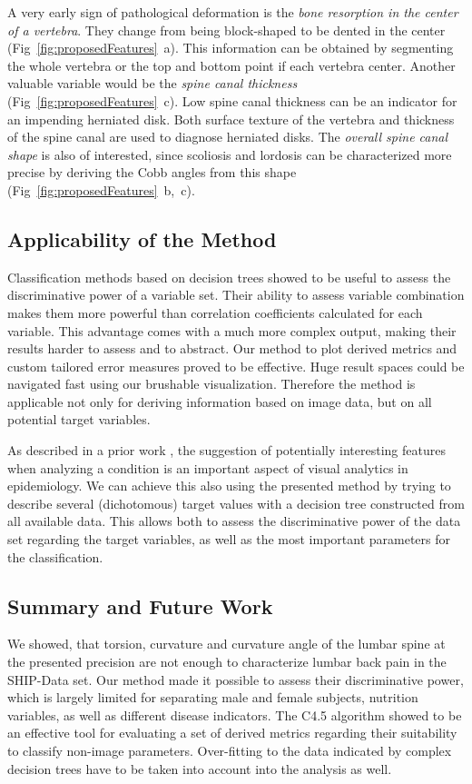 \documentclass[a4paper,twoside]{style/article}
\begin{document}
A very early sign of pathological deformation is the \emph{bone resorption in the center of a vertebra}.
They change from being block-shaped to be dented in the center (Fig~\ref{fig:proposedFeatures}~a).
This information can be obtained by segmenting the whole vertebra or the top and bottom point if each vertebra center.
Another valuable variable would be the \emph{spine canal thickness} (Fig~\ref{fig:proposedFeatures}~c).
Low spine canal thickness can be an indicator for an impending herniated disk.
Both surface texture of the vertebra and thickness of the spine canal are used to diagnose herniated disks.
The \emph{overall spine canal shape} is also of interested, since scoliosis and lordosis can be characterized more precise by deriving the Cobb angles from this shape (Fig~\ref{fig:proposedFeatures}~b,~c).
\subsection{Applicability of the Method}
Classification methods based on decision trees showed to be useful to assess the discriminative power of a variable set.
Their ability to assess variable combination makes them more powerful than correlation coefficients calculated for each variable.
This advantage comes with a much more complex output, making their results harder to assess and to abstract.
Our method to plot derived metrics and custom tailored error measures proved to be effective.
Huge result spaces could be navigated fast using our brushable visualization.
Therefore the method is applicable not only for deriving information based on image data, but on all potential target variables.

As described in a prior work \cite{Klemm2014VIS}, the suggestion of potentially interesting features when analyzing a condition is an important aspect of visual analytics in epidemiology.
We can achieve this also using the presented method by trying to describe several (dichotomous) target values with a decision tree constructed from all available data.
This allows both to assess the discriminative power of the data set regarding the target variables, as well as the most important parameters for the classification.

\subsection{Summary and Future Work}
\noindent We showed, that torsion, curvature and curvature angle of the lumbar spine at the presented precision are not enough to characterize lumbar back pain in the SHIP-Data set.
Our method made it possible to assess their discriminative power, which is largely limited for separating male and female subjects, nutrition variables, as well as different disease indicators.
The C4.5 algorithm showed to be an effective tool for evaluating a set of derived metrics regarding their suitability to classify non-image parameters.
Over-fitting to the data indicated by complex decision trees have to be taken into account into the analysis as well.
\end{document}
